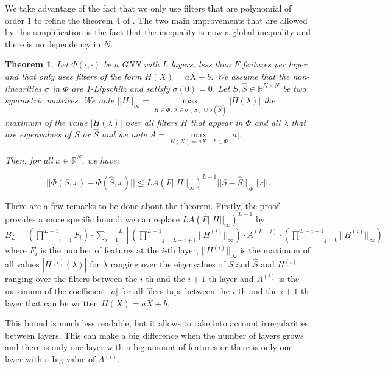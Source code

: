 \documentclass[11pt,a4paper]{article}
\newcommand{\op}[1]{|| #1 ||_{op}}
\newcommand{\ninf}[1]{|| #1 ||_\infty}
\newcommand{\Sum}[2]{\overset{#2}{\underset{#1}{\sum}}}
\newtheorem{theorem}{Theorem}
\theoremstyle{definition}
\renewcommand{\leq}{\leqslant}
\begin{document}
    We take advantage of the fact that we only use filters that are polynomial of order 1 to refine the theorem 4 of . The two main improvements that are allowed by this simplification is the fact that the inequality is now a global inequality and there is no dependency in $N$.

    \begin{theorem}
    \label{thm:stability_general}
            Let $\Phi (\cdot , \cdot)$ be a GNN with $L$ layers, less than $F$ features per layer and that only uses filters of the form $H(X) = aX + b$. We assume that the non-linearities $\sigma$ in $\Phi$ are 1-Lipschitz and satisfy $\sigma(0)=0$. Let $S, \hat{S} \in \mathbb{R}^{N \times N}$ be two symmetric matrices. We note $\ninf{H} = \underset{H \in \Phi, \ \lambda \in \sigma(S) \cup \sigma(\hat{S})}{\max} |H(\lambda)|$ the maximum of the value $|H(\lambda)|$ over all filters $H$ that appear in $\Phi$ and all $\lambda$ that are eigenvalues of $S$ or $\hat{S}$ and we note $A = \underset{H(X)=aX+b \in \Phi}{\max} |a|$.

            Then, for all $x \in \mathbb{R}^N$, we have:

                $$|| \Phi (S,x) - \Phi (\hat{S},x) || \leq L A (F \ninf{H} )^ {L-1} \op{S - \hat{S}} ||x||.$$

        \end{theorem}


        There are a few remarks to be done about the theorem. Firstly, the proof provides a more specific bound: we can replace  $L A (F \ninf{H} )^ {L-1}$ by $B_L = \left( \underset{i=1}{\overset{L-1}{\prod}} F_i \right)  \cdot \Sum{i=1}{L} \left[ (\underset{j=L-i+1}{\overset{L-1}{\prod}} \ninf{H ^{(i)}}) \cdot A^{(L-i)} \cdot (\underset{j=0}{\overset{L-i-1}{\prod}} \ninf{H ^{(i)}}) \right] $ where $F_i$ is the number of features at the $i$-th layer, $\ninf{H^{(i)}}$ is the maximum of all values $|H^{(i)}(\lambda)|$ for $\lambda$ ranging over the eigenvalues of $S$ and $\hat{S}$ and $H^{(i)}$ ranging over the filters between the $i$-th and the $i+1$-th layer and $A^{(i)}$ is the maximum of the coefficient $|a|$ for all filers taps between the $i$-th and the $i+1$-th layer that can be written $H(X)=aX+b$.

        This bound is much less readable, but it allows to take into account irregularities between layers. This can make a big difference when the number of layers grows and there is only one layer with a big amount of features or there is only one layer with a big value of $A^{(i)}$.
\end{document}
